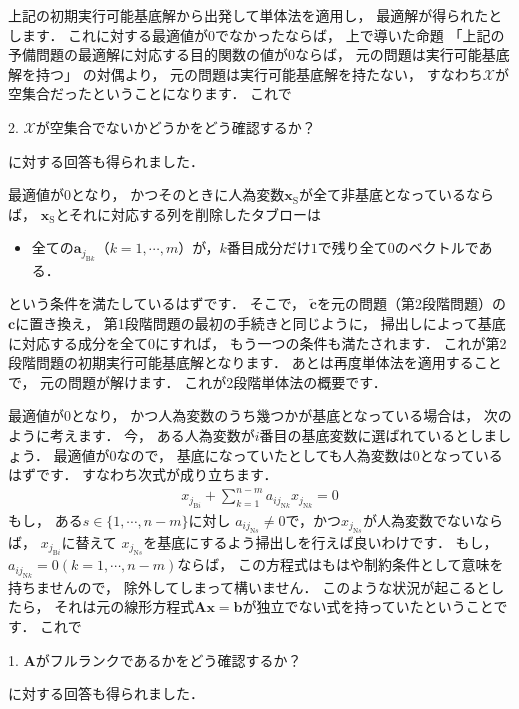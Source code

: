 ﻿\documentclass[a4paper]{jsarticle}
\begin{document}
上記の初期実行可能基底解から出発して単体法を適用し，
最適解が得られたとします．
これに対する最適値が$0$でなかったならば，
上で導いた命題
「上記の予備問題の最適解に対応する目的関数の値が$0$ならば，
元の問題は実行可能基底解を持つ」
の対偶より，
元の問題は実行可能基底解を持たない，
すなわち$\mathcal{X}$が空集合だったということになります．
これで
\begin{screen}
2. $\mathcal{X}$が空集合でないかどうかをどう確認するか？
\end{screen}
に対する回答も得られました．

最適値が$0$となり，
かつそのときに人為変数$\boldsymbol{x}_{\mathrm{S}}$が全て非基底となっているならば，
$\boldsymbol{x}_{\mathrm{S}}$とそれに対応する列を削除したタブローは
\begin{screen}
\begin{itemize}
\item{全ての$\boldsymbol{a}_{j_{\mathrm{B}k}}$（$k=1,\cdots,m$）が，$k$番目成分だけ$1$で残り全て$0$のベクトルである．}
\end{itemize}
\end{screen}
という条件を満たしているはずです．
そこで，
$\tilde{\boldsymbol{c}}$を元の問題（第2段階問題）の$\boldsymbol{c}$に置き換え，
第1段階問題の最初の手続きと同じように，
掃出しによって基底に対応する成分を全て$0$にすれば，
もう一つの条件も満たされます．
これが第2段階問題の初期実行可能基底解となります．
あとは再度単体法を適用することで，
元の問題が解けます．
これが2段階単体法の概要です．

最適値が$0$となり，
かつ人為変数のうち幾つかが基底となっている場合は，
次のように考えます．
今，
ある人為変数が$i$番目の基底変数に選ばれているとしましょう．
最適値が$0$なので，
基底になっていたとしても人為変数は$0$となっているはずです．
すなわち次式が成り立ちます．
\begin{align*}
x_{j_{\mathrm{B}i}}+\sum_{k=1}^{n-m}a_{ij_{\mathrm{N}k}}x_{j_{\mathrm{N}k}}=0
\end{align*}
もし，
ある$s\in\{1,\cdots,n-m\}$に対し
$a_{ij_{\mathrm{N}s}}\neq 0$で，かつ$x_{j_{\mathrm{N}s}}$が人為変数でないならば，
$x_{j_{\mathrm{B}i}}$に替えて
$x_{j_{\mathrm{N}s}}$を基底にするよう掃出しを行えば良いわけです．
もし，
$a_{ij_{\mathrm{N}k}}=0 (k=1,\cdots,n-m)$ならば，
この方程式はもはや制約条件として意味を持ちませんので，
除外してしまって構いません．
このような状況が起こるとしたら，
それは元の線形方程式$\boldsymbol{A}\boldsymbol{x}=\boldsymbol{b}$が独立でない式を持っていたということです．
これで
\begin{screen}
1. $\boldsymbol{A}$がフルランクであるかをどう確認するか？
\end{screen}
に対する回答も得られました．
\end{document}
